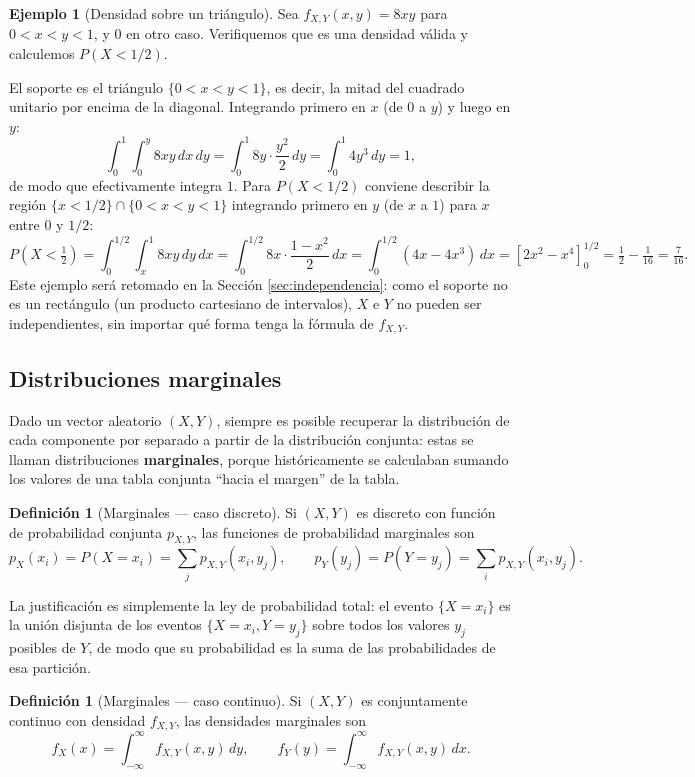 \documentclass[11pt,a4paper]{article}
\theoremstyle{plain}
\theoremstyle{definition}
\newtheorem{definicion}[teorema]{Definición}
\newtheorem{ejemplo}[teorema]{Ejemplo}
\theoremstyle{remark}
\begin{document}
\begin{ejemplo}[Densidad sobre un triángulo]\label{ej:densidad-triangulo}
Sea $f_{X,Y}(x,y) = 8xy$ para $0<x<y<1$, y $0$ en otro caso. Verifiquemos que es una densidad válida y calculemos $P(X<1/2)$.

El soporte es el triángulo $\{0<x<y<1\}$, es decir, la mitad del cuadrado unitario por encima de la diagonal. Integrando primero en $x$ (de $0$ a $y$) y luego en $y$:
\[
\int_0^1\int_0^y 8xy\,dx\,dy = \int_0^1 8y\cdot\frac{y^2}{2}\,dy = \int_0^1 4y^3\,dy = 1,
\]
de modo que efectivamente integra $1$. Para $P(X<1/2)$ conviene describir la región $\{x<1/2\}\cap\{0<x<y<1\}$ integrando primero en $y$ (de $x$ a $1$) para $x$ entre $0$ y $1/2$:
\[
P(X<\tfrac12) = \int_0^{1/2}\int_x^1 8xy\,dy\,dx = \int_0^{1/2} 8x\cdot\frac{1-x^2}{2}\,dx = \int_0^{1/2}(4x-4x^3)\,dx = \left[2x^2-x^4\right]_0^{1/2} = \tfrac12-\tfrac{1}{16}=\tfrac{7}{16}.
\]
Este ejemplo será retomado en la Sección \ref{sec:independencia}: como el soporte no es un rectángulo (un producto cartesiano de intervalos), $X$ e $Y$ no pueden ser independientes, sin importar qué forma tenga la fórmula de $f_{X,Y}$.
\end{ejemplo}

\subsection{Distribuciones marginales}

Dado un vector aleatorio $(X,Y)$, siempre es posible recuperar la distribución de cada componente por separado a partir de la distribución conjunta: estas se llaman distribuciones \textbf{marginales}, porque históricamente se calculaban sumando los valores de una tabla conjunta ``hacia el margen'' de la tabla.

\begin{definicion}[Marginales — caso discreto]
Si $(X,Y)$ es discreto con función de probabilidad conjunta $p_{X,Y}$, las funciones de probabilidad marginales son
\[
p_X(x_i) = P(X=x_i) = \sum_j p_{X,Y}(x_i,y_j), \qquad p_Y(y_j) = P(Y=y_j) = \sum_i p_{X,Y}(x_i,y_j).
\]
\end{definicion}

La justificación es simplemente la ley de probabilidad total: el evento $\{X=x_i\}$ es la unión disjunta de los eventos $\{X=x_i, Y=y_j\}$ sobre todos los valores $y_j$ posibles de $Y$, de modo que su probabilidad es la suma de las probabilidades de esa partición.

\begin{definicion}[Marginales — caso continuo]
Si $(X,Y)$ es conjuntamente continuo con densidad $f_{X,Y}$, las densidades marginales son
\[
f_X(x) = \int_{-\infty}^{\infty} f_{X,Y}(x,y)\,dy, \qquad f_Y(y) = \int_{-\infty}^{\infty} f_{X,Y}(x,y)\,dx.
\]
\end{definicion}
\end{document}
